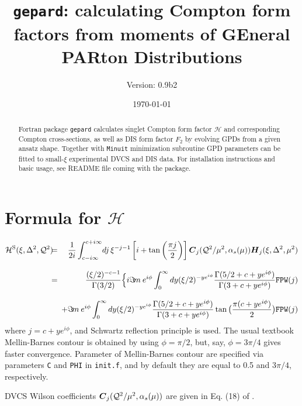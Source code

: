 \documentclass[12pt]{article}
\begin{document}
\title{\texttt{gepard}: calculating Compton form factors from moments of GEneral PARton Distributions } 
\author{Version: 0.9b2}
\date{\today}
\maketitle

\begin{abstract}
Fortran package \texttt{gepard} calculates singlet Compton form factor
$\mathcal{H}$ and corresponding Compton cross-sections, as well as
DIS form factor $F_2$ by evolving GPDs from a given ansatz shape.  Together
with \texttt{Minuit} minimization subroutine GPD parameters can be fitted to
small-$\xi$ experimental DVCS and DIS data. For installation instructions and
basic usage, see README file coming with the package.
\end{abstract}

\section{Formula for $\mathcal{H}$}  

\begin{eqnarray*}
{{\cal H}^{\rm S}}(\xi,\Delta^2,{\cal Q}^2)
&\!\!\!=\!\!\!& \frac{1}{2i}\int_{c-i \infty}^{c+ i \infty}\!
dj\,\xi^{-j-1} \left[i + \tan \left(\frac{\pi j}{2}\right) \right]
\mbox{\boldmath $C$}_{j}({\cal Q}^2/\mu^2,\alpha_s(\mu)) 
\mbox{\boldmath $H$}_{j} (\xi,\Delta^2,\mu^2) \\[2ex]
&\!\!\!=\!\!\!& \frac{(\xi/2)^{-c-1}}{\Gamma(3/2)}\Big\{i \Im\! m\: e^{i\phi} 
\int_{0}^{\infty} dy  (\xi/2)^{- y e^{i\phi}} 
\frac{\Gamma(5/2 + c + y e^{i\phi})}{\Gamma(3 + c + y e^{i\phi})}
\texttt{FPW}(j) \\[2ex]
& & + \Im\! m\:  e^{i\phi} 
\int_{0}^{\infty} dy  (\xi/2)^{- y e^{i\phi}}
\frac{\Gamma(5/2 + c + y e^{i\phi})}{\Gamma(3 + c + y e^{i\phi})}
\tan\big(\frac{\pi(c + y e^{i\phi})}{2}\big)
\texttt{FPW}(j)
\label{<Hformula>}
\end{eqnarray*} 
where $j=c+ye^{i\phi}$, and Schwartz reflection principle is
used.
The usual textbook Mellin-Barnes contour is obtained by
using $\phi = \pi/2$, but, say, $\phi = 3\pi /4$ gives faster
convergence. Parameter of Mellin-Barnes contour are specified
via parameters \texttt{C} and \texttt{PHI} in \texttt{init.f},
and by default they are equal to 0.5 and $3\pi/4$, respectively.

DVCS Wilson coefficients $\mbox{\boldmath $C$}_{j}({\cal Q}^2/\mu^2,\alpha_s(\mu))$
are given in Eq. (18) of \cite{Kumericki:2006xx}. 
\end{document}
